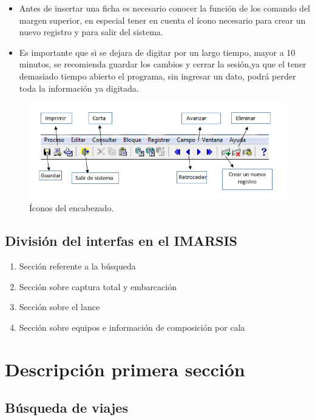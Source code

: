 \documentclass[a4paper,oneside,11pt]{book}
\begin{document}
\begin{itemize}
\item {Antes de insertar una ficha es necesario conocer la función de los comando del margen superior, en especial tener en cuenta el ícono necesario para crear un nuevo registro y para salir del sistema.}
\item {Es importante que si se dejara de digitar por un largo tiempo, mayor a 10 minutos, se recomienda guardar los cambios y cerrar la sesión,ya que el tener demasiado tiempo abierto el programa, sin ingresar un dato, podrá perder toda la información ya digitada.}
\end{itemize}
  \begin{figure} [!h]
  	\begin{center}
  		\includegraphics[scale=0.85]{imagen_Manual_PBP/casillas.png}
  		\vspace{-20pt}
  		\caption{Íconos del encabezado.}
  	\end{center}
  \end{figure}
 
 \subsection{División del interfas en el IMARSIS}
 \begin{enumerate}
 \item Sección referente a la búsqueda
 \item Sección sobre captura total y embarcación
 \item Sección sobre el lance
 \item Sección sobre equipos e información de composición por cala
 
 \end{enumerate}
 
\section{Descripción primera sección }
\subsection{Búsqueda de viajes}
\end{document}

